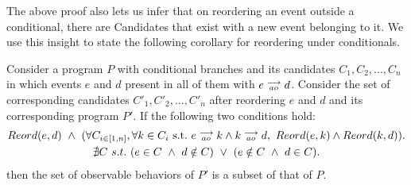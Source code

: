         The above proof also lets us infer that on reordering an event outside a conditional, there are Candidates that exist with a new event belonging to it. 
        We use this insight to state the following corollary for reordering under conditionals. 
        \begin{corollary}
            \label{ReordCond}
            Consider a program $P$ with conditional branches and its candidates $C_1, C_2, ... , C_n$ in which events $e$ and $d$ present in all of them with $e\stackrel{\longrightarrow}{_{ao}}d$. 
            Consider the set of corresponding candidates $C'_1, C'_2, ... , C'_n$ after reordering $e$ and $d$ and its corresponding program $P'$. 
            If the following two conditions hold:
            \begin{gather*}
                Reord(e,d) \ \wedge \ 
                ( \forall C_{i \in [1,n]}, \forall k \in C_i \ \text{s.t.} \ \reln{e}{ao}{k} \wedge \reln{k}{ao}{d}, \    
                Reord(e,k) \wedge Reord(k,d) ). \\
                \nexists C \ s.t. \ 
                    (e \in C \ \wedge \ d \notin C) \ \vee \ 
                    (e \notin C \ \wedge \ d \in C). 
            \end{gather*}
            then the set of observable behaviors of $P'$ is a subset of that of $P$. 
        \end{corollary}

